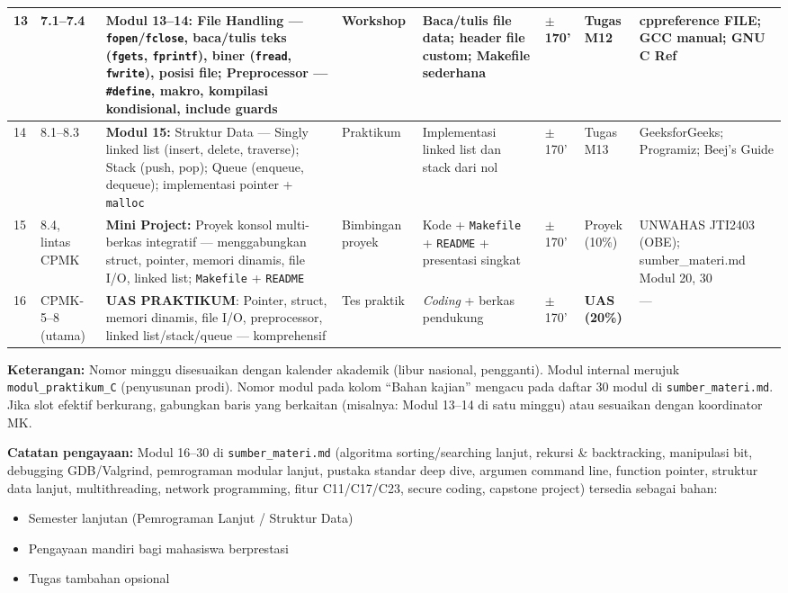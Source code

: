 \documentclass[12pt,a4paper]{article}
\begin{document}
{\begin{landscape}
\begin{longtable}{|p{0.55cm}|p{2.35cm}|p{2.8cm}|p{1.65cm}|p{2.55cm}|p{1.0cm}|p{1.65cm}|p{3.0cm}|}
\hline
13 & 7.1--7.4 & \textbf{Modul 13--14:} File Handling --- \texttt{fopen}/\texttt{fclose}, baca/tulis teks (\texttt{fgets}, \texttt{fprintf}), biner (\texttt{fread}, \texttt{fwrite}), posisi file; Preprocessor --- \texttt{\#define}, makro, kompilasi kondisional, include guards & Workshop & Baca/tulis file data; header file custom; Makefile sederhana & $\pm$170' & Tugas M12 & cppreference FILE; GCC manual; GNU C Ref \\
\hline
14 & 8.1--8.3 & \textbf{Modul 15:} Struktur Data --- Singly linked list (insert, delete, traverse); Stack (push, pop); Queue (enqueue, dequeue); implementasi pointer + \texttt{malloc} & Praktikum & Implementasi linked list dan stack dari nol & $\pm$170' & Tugas M13 & GeeksforGeeks; Programiz; Beej's Guide \\
\hline
15 & 8.4, lintas CPMK & \textbf{Mini Project:} Proyek konsol multi-berkas integratif --- menggabungkan struct, pointer, memori dinamis, file I/O, linked list; \texttt{Makefile} + \texttt{README} & Bimbingan proyek & Kode + \texttt{Makefile} + \texttt{README} + presentasi singkat & $\pm$170' & Proyek (10\%) & UNWAHAS JTI2403 (OBE); sumber\_materi.md Modul 20, 30 \\
\hline
16 & CPMK-5--8 (utama) & \textbf{UAS PRAKTIKUM}: Pointer, struct, memori dinamis, file I/O, preprocessor, linked list/stack/queue --- komprehensif & Tes praktik & \textit{Coding} + berkas pendukung & $\pm$170' & \textbf{UAS (20\%)} & --- \\
\hline
\end{longtable}
\end{landscape}
}

\vspace{0.5cm}

\noindent\textbf{Keterangan:} Nomor minggu disesuaikan dengan kalender akademik (libur nasional, pengganti). Modul internal merujuk \texttt{modul\_praktikum\_C} (penyusunan prodi). Nomor modul pada kolom ``Bahan kajian'' mengacu pada daftar 30 modul di \texttt{sumber\_materi.md}. Jika slot efektif berkurang, gabungkan baris yang berkaitan (misalnya: Modul 13--14 di satu minggu) atau sesuaikan dengan koordinator MK.

\noindent\textbf{Catatan pengayaan:} Modul 16--30 di \texttt{sumber\_materi.md} (algoritma sorting/searching lanjut, rekursi \& backtracking, manipulasi bit, debugging GDB/Valgrind, pemrograman modular lanjut, pustaka standar deep dive, argumen command line, function pointer, struktur data lanjut, multithreading, network programming, fitur C11/C17/C23, secure coding, capstone project) tersedia sebagai bahan:
\begin{itemize}[nosep]
  \item Semester lanjutan (Pemrograman Lanjut / Struktur Data)
  \item Pengayaan mandiri bagi mahasiswa berprestasi
  \item Tugas tambahan opsional
\end{itemize}
\end{document}
